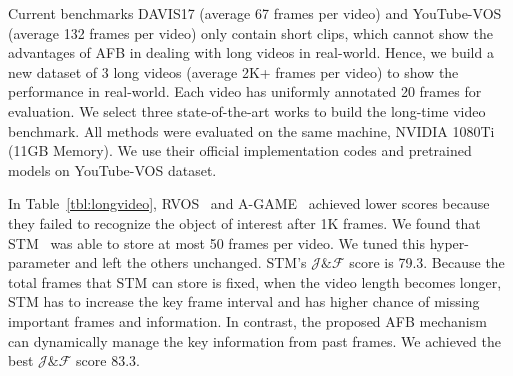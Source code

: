 \documentclass{article}
\begin{document}
Current benchmarks DAVIS17 (average 67 frames per video) and YouTube-VOS (average 132 frames per video) only contain short clips, which cannot show the advantages of AFB in dealing with long
videos in real-world.
Hence, we build a new dataset of 3 long videos (average 2K+ frames per video) to show the performance
in real-world.
Each video has uniformly annotated 20 frames for evaluation. 
We select three state-of-the-art works to build the long-time video benchmark.
All methods were evaluated on the same machine, NVIDIA 1080Ti (11GB Memory).
We use their official implementation codes and pretrained models on YouTube-VOS dataset.

In Table~\ref{tbl:longvideo}, RVOS~\cite{ventura2019rvos} and A-GAME~\cite{johnander2019generative} achieved lower scores because they failed to recognize the object of interest after 1K frames.
We found that STM~\cite{oh_video_2019} was able to store at most 50 frames per video. 
We tuned this hyper-parameter and left the others unchanged.
STM's $\mathcal{J} \& \mathcal{F}$ score is 79.3. 
Because the total frames that STM can store is fixed, when the video length becomes longer, STM has to increase the key frame interval and has higher chance of missing important frames and information. 
In contrast, the proposed AFB mechanism can dynamically manage the key information from past frames.
We achieved the best $\mathcal{J} \& \mathcal{F}$ score 83.3.
\end{document}
